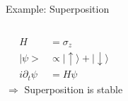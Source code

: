 \documentclass[
]{beamer}
\begin{document}
\begin{frame}{Example: Superposition}
	\begin{columns}
		\begin{align*}
			H &= \sigma_z\\
			|\psi> &\propto |\uparrow\rangle + |\downarrow\rangle\\
			i \partial_t \psi &= H \psi
		\end{align*}
		$\Rightarrow$ Superposition is stable



		\centering
	\end{columns}
\end{frame}
\end{document}
